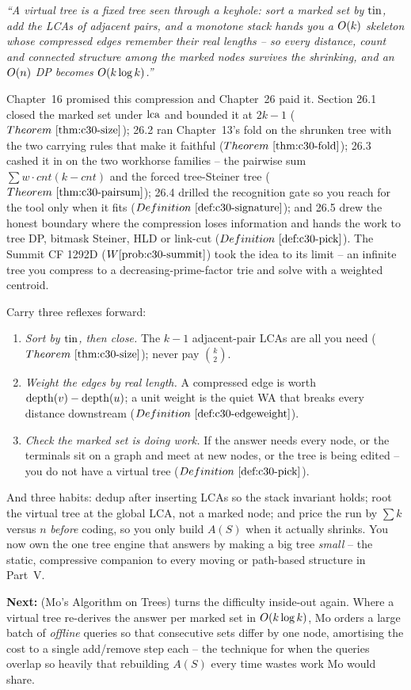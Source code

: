 \begin{lastword}
\emph{``A virtual tree is a fixed tree seen through a keyhole: sort a marked set by \(\operatorname{tin}\), add the
LCAs of adjacent pairs, and a monotone stack hands you a \(O(k)\) skeleton whose compressed edges
remember their real lengths -- so every distance, count and connected structure among the marked nodes
survives the shrinking, and an \(O(n)\) DP becomes \(O(k\log k)\).''}

\medskip
Chapter~16 promised this compression and Chapter~26 paid it. Section 26.1 closed the marked set under
\(\operatorname{lca}\) and bounded it at \(2k-1\) (\(\thmref{c30-size}\)); 26.2 ran Chapter~13's fold on the shrunken
tree with the two carrying rules that make it faithful (\(\thmref{c30-fold}\)); 26.3 cashed it in on
the two workhorse families -- the pairwise sum \(\sum w\cdot\mathit{cnt}(k-\mathit{cnt})\) and the
forced tree-Steiner tree (\(\thmref{c30-pairsum}\)); 26.4 drilled the recognition gate so you reach for
the tool only when it fits (\(\defref{c30-signature}\)); and 26.5 drew the honest boundary where the
compression loses information and hands the work to tree DP, bitmask Steiner, HLD or link-cut
(\(\defref{c30-pick}\)). The Summit CF 1292D (\(\probref{c30-summit}\)) took the idea to its limit -- an
infinite tree you compress to a decreasing-prime-factor trie and solve with a weighted centroid.

\medskip
Carry three reflexes forward:
\begin{enumerate}[nosep, leftmargin=1.6em]
  \item \emph{Sort by \(\operatorname{tin}\), then close.} The \(k-1\) adjacent-pair LCAs are all you need
        (\(\thmref{c30-size}\)); never pay \(\binom{k}{2}\).
  \item \emph{Weight the edges by real length.} A compressed edge is worth \(\operatorname{depth}(v)-\operatorname{depth}(u)\);
        a unit weight is the quiet WA that breaks every distance downstream
        (\(\defref{c30-edgeweight}\)).
  \item \emph{Check the marked set is doing work.} If the answer needs every node, or the terminals
        sit on a graph and meet at new nodes, or the tree is being edited -- you do not have a virtual
        tree (\(\defref{c30-pick}\)).
\end{enumerate}

\medskip
And three habits: dedup after inserting LCAs so the stack invariant holds; root the virtual tree at the
global LCA, not a marked node; and price the run by \(\sum k\) versus \(n\) \emph{before} coding, so you
only build \(A(S)\) when it actually shrinks. You now own the one tree engine that answers by making a
big tree \emph{small} -- the static, compressive companion to every moving or path-based structure in Part~V.

\medskip
\textbf{Next:}  (Mo's Algorithm on Trees) turns the difficulty inside-out again. Where a
virtual tree re-derives the answer per marked set in \(O(k\log k)\), Mo orders a large batch of
\emph{offline} queries so that consecutive sets differ by one node, amortising the cost to a single
add/remove step each -- the technique for when the queries overlap so heavily that rebuilding \(A(S)\)
every time wastes work Mo would share.
\end{lastword}
